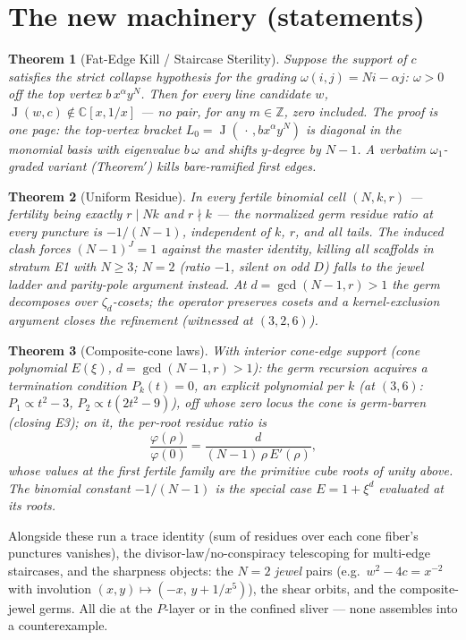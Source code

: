 \documentclass[11pt]{article}
\newtheorem{theorem}{Theorem}
\newcommand{\C}{\mathbb{C}}
\newcommand{\J}{\operatorname{J}}
\begin{document}
\section{The new machinery (statements)}

\begin{theorem}[Fat-Edge Kill / Staircase Sterility]
Suppose the support of $c$ satisfies the strict collapse hypothesis for the
grading $\omega(i, j) = Ni - \alpha j$: $\omega > 0$ off the top vertex
$b\,x^{\alpha}y^{N}$. Then for every line candidate $w$,
$\J(w, c) \notin \C[x, 1/x]$ --- no pair, for any $m \in \mathbb{Z}$, zero
included. The proof is one page: the top-vertex bracket
$L_0 = \J(\,\cdot\,, b x^{\alpha} y^{N})$ is diagonal in the monomial basis
with eigenvalue $b\,\omega$ and shifts $y$-degree by $N-1$. A verbatim
$\omega_1$-graded variant (Theorem$'$) kills bare-ramified first edges.
\end{theorem}

\begin{theorem}[Uniform Residue]
In every fertile binomial cell $(N, k, r)$ --- fertility being exactly
$r \mid Nk$ and $r \nmid k$ --- the normalized germ residue ratio at every
puncture is $-1/(N-1)$, independent of $k$, $r$, and all tails. The induced
clash forces $(N-1)^J = 1$ against the master identity, killing all
scaffolds in stratum E1 with $N \ge 3$; $N = 2$ (ratio $-1$, silent on odd
$D$) falls to the jewel ladder and parity-pole argument instead. At
$d = \gcd(N-1, r) > 1$ the germ decomposes over $\zeta_d$-cosets; the
operator preserves cosets and a kernel-exclusion argument closes the
refinement (witnessed at $(3,2,6)$).
\end{theorem}

\begin{theorem}[Composite-cone laws]
With interior cone-edge support (cone polynomial $E(\xi)$,
$d = \gcd(N-1, r) > 1$): the germ recursion acquires a termination condition
$P_k(t) = 0$, an explicit polynomial per $k$ (at $(3,6)$:
$P_1 \propto t^2 - 3$, $P_2 \propto t(2t^2-9)$), off whose zero locus the
cone is germ-barren (closing E3); on it, the per-root residue ratio is
\[
\frac{\varphi(\rho)}{\varphi(0)} = \frac{d}{(N-1)\,\rho\,E'(\rho)},
\]
whose values at the first fertile family are the primitive cube roots of
unity above. The binomial constant $-1/(N-1)$ is the special case
$E = 1 + \xi^d$ evaluated at its roots.
\end{theorem}

Alongside these run a trace identity (sum of residues over each cone
fiber's punctures vanishes), the divisor-law/no-conspiracy telescoping for
multi-edge staircases, and the sharpness objects: the $N = 2$ \emph{jewel}
pairs (e.g.\ $w^2 - 4c = x^{-2}$ with involution
$(x,y) \mapsto (-x,\, y + 1/x^5)$), the shear orbits, and the
composite-jewel germs. All die at the $P$-layer or in the confined sliver
--- none assembles into a counterexample.
\end{document}
